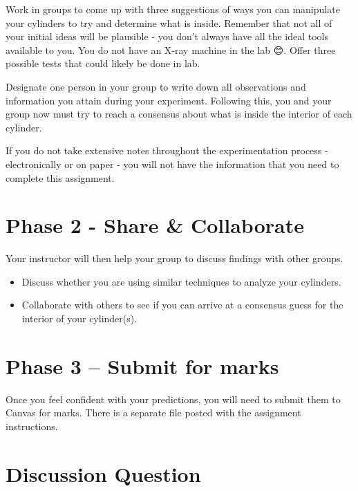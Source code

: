 \documentclass[
]{book}
\providecommand{\tightlist}{%
  \setlength{\itemsep}{0pt}\setlength{\parskip}{0pt}}
\begin{document}
Work in groups to come up with three suggestions of ways you can manipulate your cylinders to try and determine what is inside. Remember that not all of your initial ideas will be plausible - you don't always have all the ideal tools available to you. You do not have an X-ray machine in the lab 😊. Offer three possible tests that could likely be done in lab.

Designate one person in your group to write down all observations and information you attain during your experiment. Following this, you and your group now must try to reach a consensus about what is inside the interior of each cylinder.

If you do not take extensive notes throughout the experimentation process - electronically or on paper - you will not have the information that you need to complete this assignment.

\hypertarget{phase-2---share-collaborate}{%
\section*{Phase 2 - Share \& Collaborate}\label{phase-2---share-collaborate}}

Your instructor will then help your group to discuss findings with other groups.

\begin{itemize}
\tightlist
\item
  Discuss whether you are using similar techniques to analyze your cylinders.
\item
  Collaborate with others to see if you can arrive at a consensus guess for the interior of your cylinder(s).
\end{itemize}

\hypertarget{phase-3-submit-for-marks}{%
\section*{Phase 3 -- Submit for marks}\label{phase-3-submit-for-marks}}

Once you feel confident with your predictions, you will need to submit them to Canvas for marks. There is a separate file posted with the assignment instructions.

\hypertarget{discussion-question}{%
\section*{Discussion Question}\label{discussion-question}}
\end{document}
